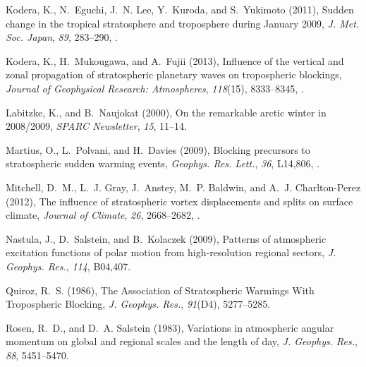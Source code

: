 \documentclass[draft,jgrga]{agutex}
\begin{document}
\begin{article}
\begin{thebibliography}{38}
Kodera, K., N.~Eguchi, J.~N. Lee, Y.~Kuroda, and S.~Yukimoto (2011), Sudden
  change in the tropical stratosphere and troposphere during {January} 2009,
  \textit{J. Met. Soc. Japan}, \textit{89}, 283--290,
  .

Kodera, K., H.~Mukougawa, and A.~Fujii (2013), {Influence of the vertical and
  zonal propagation of stratospheric planetary waves on tropospheric
  blockings}, \textit{Journal of Geophysical Research: Atmospheres},
  \textit{118}(15), 8333--8345, .

Labitzke, K., and B.~Naujokat (2000), On the remarkable arctic winter in
  2008/2009, \textit{{SPARC} Newsletter}, \textit{15}, 11--14.

Martius, O., L.~Polvani, and H.~Davies (2009), Blocking precursors to
  stratospheric sudden warming events, \textit{Geophys. Res. Lett.},
  \textit{36}, L14,806, .

Mitchell, D.~M., L.~J. Gray, J.~Anstey, M.~P. Baldwin, and A.~J. Charlton-Perez
  (2012), The influence of stratospheric vortex displacements and splits on
  surface climate, \textit{Journal of Climate}, \textit{26}, 2668--2682,
  .

Nastula, J., D.~Salstein, and B.~Kolaczek (2009), Patterns of atmospheric
  excitation functions of polar motion from high-resolution regional sectors,
  \textit{J. Geophys. Res.}, \textit{114}, B04,407.

Quiroz, R.~S. (1986), {The Association of Stratospheric Warmings With
  Tropospheric Blocking}, \textit{J. Geophys. Res.}, \textit{91}(D4),
  5277--5285.

Rosen, R.~D., and D.~A. Salstein (1983), Variations in atmospheric angular
  momentum on global and regional scales and the length of day, \textit{J.
  Geophys. Res.}, \textit{88}, 5451--5470.


\end{thebibliography}
\end{article}
\end{document}
